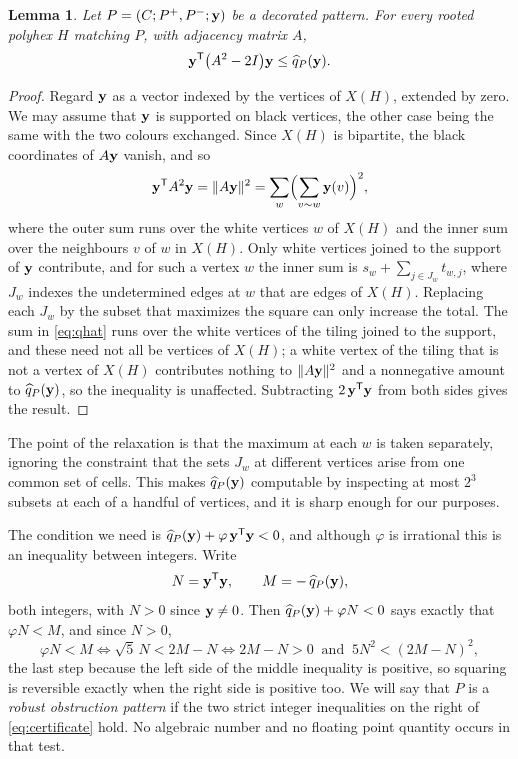 \documentclass[11pt]{article}
\newcommand\vphi{\varphi}
\newcommand\tp{^{\mathsf T}}
\newtheorem{lemma}[theorem]{Lemma}
\theoremstyle{definition}
\begin{document}
\begin{lemma}\label{lem:qhat}
Let $P=(C;P^{+},P^{-};{\mathbf y})$ be a decorated pattern.  For every rooted polyhex
$H$ matching $P$, with adjacency matrix $A$,
\[
 \Zy\tp\bigl(A^{2}-2I\bigr)\Zy\le\widehat q_P(\Zy) .
\]
\end{lemma}

\begin{proof}
Regard ${\mathbf y}$ as a vector indexed by the vertices of $X(H)$, extended by zero.
We may assume that ${\mathbf y}$ is supported on black vertices, the other case being
the same with the two colours exchanged.  Since $X(H)$ is bipartite, the
black coordinates of $A{\mathbf y}$ vanish, and so
\[
 \Zy\tp A^{2}\Zy=\lVert A\Zy\rVert^{2}
 =\sum_{w}\Bigl(\sum_{v\sim w}\Zy(v)\Bigr)^{2},
\]
where the outer sum runs over the white vertices $w$ of $X(H)$ and the inner
sum over the neighbours $v$ of $w$ in $X(H)$.  Only white vertices joined to
the support of ${\mathbf y}$ contribute, and for such a vertex $w$ the inner sum is
$s_w+\sum_{j\in J_w}t_{w,j}$, where $J_w$ indexes the undetermined edges at
$w$ that are edges of $X(H)$.  Replacing each $J_w$ by the subset that
maximizes the square can only increase the total.  The sum in
\eqref{eq:qhat} runs over the white vertices of the tiling joined to the
support, and these need not all be vertices of $X(H)$; a white vertex of the
tiling that is not a vertex of $X(H)$ contributes nothing to
$\lVert A{\mathbf y}\rVert^{2}$ and a nonnegative amount to $\widehat q_P({\mathbf y})$, so
the inequality is unaffected.  Subtracting
$2\,\Zy\tp\Zy$ from both sides gives the result.
\end{proof}

The point of the relaxation is that the maximum at each $w$ is taken
separately, ignoring the constraint that the sets $J_w$ at different
vertices arise from one common set of cells.  This makes
$\widehat q_P({\mathbf y})$ computable by inspecting at most $2^{3}$ subsets at each
of a handful of vertices, and it is sharp enough for our purposes.

The condition we need is $\widehat q_P(\Zy)+\vphi\,\Zy\tp\Zy<0$, and although
$\vphi$ is irrational this is an inequality between integers.  Write
\[
 N=\Zy\tp\Zy,\qquad M=-\,\widehat q_P(\Zy),
\]
both integers, with $N>0$ since ${\mathbf y}\ne0$.  Then $\widehat q_P(\Zy)+\vphi N<0$
says exactly that $\vphi N<M$, and since $N>0$,
\begin{equation}\label{eq:certificate}
 \vphi N<M
 \iff \sqrt5\,N<2M-N
 \iff 2M-N>0\ \text{ and }\ 5N^{2}<(2M-N)^{2},
\end{equation}
the last step because the left side of the middle inequality is positive, so
squaring is reversible exactly when the right side is positive too.  We will
say that $P$ is a \textsl{robust obstruction pattern} if the two strict
integer inequalities on the right of \eqref{eq:certificate} hold.  No
algebraic number and no floating point quantity occurs in that test.
\end{document}
